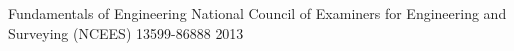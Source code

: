 

\begin{cvhonors}

  \cvhonor
    {Fundamentals of Engineering} %
		{National Council of Examiners for Engineering and Surveying (NCEES)} %
    {13599-86888} %
    {2013} %

\end{cvhonors}
